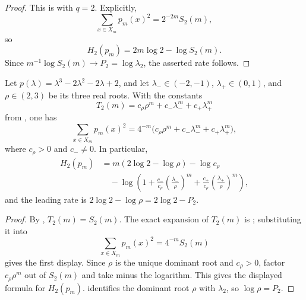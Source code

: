 \begin{proof}
This is  with \(q=2\).  Explicitly,
\[
  \sum_{x\in X_m}p_m(x)^2=2^{-2m}S_2(m),
\]
so
\[
  H_2(p_m)=2m\log2-\log S_2(m).
\]
Since \(m^{-1}\log S_2(m)\to P_2=\log\lambda_2\), the asserted rate follows.
\end{proof}

\begin{corollary}
\label{cor:renyi2}
Let \(p(\lambda)=\lambda^3-2\lambda^2-2\lambda+2\), and let
\(\lambda_-\in(-2,-1)\), \(\lambda_+\in(0,1)\), and \(\rho\in(2,3)\) be its
three real roots.  With the constants
\[
  T_2(m)=c_\rho\rho^m+c_-\lambda_-^m+c_+\lambda_+^m
\]
from , one has
\[
  \sum_{x\in X_m}p_m(x)^2
  =
  4^{-m}\bigl(c_\rho\rho^m+c_-\lambda_-^m+c_+\lambda_+^m\bigr),
\]
where \(c_\rho>0\) and \(c_-\ne0\).  In particular,
\[
  \begin{aligned}
  H_2(p_m)
  &=
  m(2\log2-\log\rho)-\log c_\rho\\
  &\quad{}
  -\log\!\left(
    1+\frac{c_-}{c_\rho}\left(\frac{\lambda_-}{\rho}\right)^m
      +\frac{c_+}{c_\rho}\left(\frac{\lambda_+}{\rho}\right)^m
  \right),
  \end{aligned}
\]
and the leading rate is \(2\log2-\log\rho=2\log2-P_2\).
\end{corollary}

\begin{proof}
By , \(T_2(m)=S_2(m)\).  The exact expansion of \(T_2(m)\) is
; substituting it into
\[
  \sum_{x\in X_m}p_m(x)^2=4^{-m}S_2(m)
\]
gives the first display.  Since \(\rho\) is the unique dominant root and
\(c_\rho>0\), factor \(c_\rho\rho^m\) out of \(S_2(m)\) and take minus the
logarithm.  This gives the displayed formula for \(H_2(p_m)\).
 identifies the dominant root \(\rho\) with
\(\lambda_2\), so \(\log\rho=P_2\).
\end{proof}
